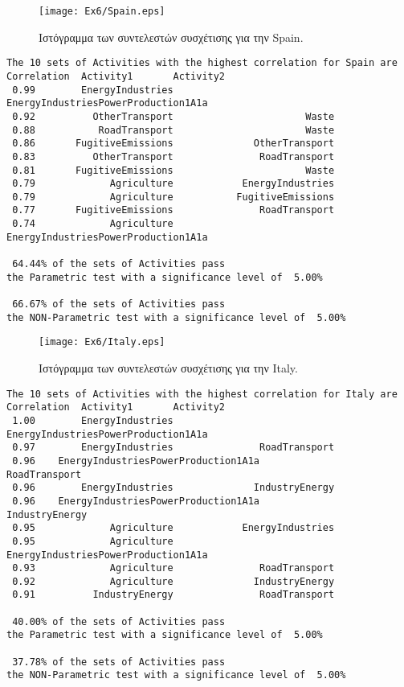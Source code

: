 \documentclass[11pt]{scrartcl} %
\begin{document}
\begin{figure}[H]
 
	\centering
	\texttt{[image: Ex6/Spain.eps]}	
\caption{Ιστόγραμμα των συντελεστών συσχέτισης για την Spain.}
\label{fig:z62}
\end{figure}



\begin{Verbatim}[fontsize=\small]
The 10 sets of Activities with the highest correlation for Spain are
Correlation	 Activity1	 	 Activity2
 0.99	     EnergyIndustries	 	 EnergyIndustriesPowerProduction1A1a 
 0.92	       OtherTransport	 	                Waste 
 0.88	        RoadTransport	 	                Waste 
 0.86	    FugitiveEmissions	 	       OtherTransport 
 0.83	       OtherTransport	 	        RoadTransport 
 0.81	    FugitiveEmissions	 	                Waste 
 0.79	          Agriculture	 	     EnergyIndustries 
 0.79	          Agriculture	 	    FugitiveEmissions 
 0.77	    FugitiveEmissions	 	        RoadTransport 
 0.74	          Agriculture	 	 EnergyIndustriesPowerProduction1A1a 

 64.44% of the sets of Activities pass 
the Parametric test with a significance level of  5.00%

 66.67% of the sets of Activities pass 
the NON-Parametric test with a significance level of  5.00%
\end{Verbatim}


\begin{figure}[H]

	\centering
	\texttt{[image: Ex6/Italy.eps]}	
\caption{Ιστόγραμμα των συντελεστών συσχέτισης για την Italy.}
\label{fig:z63} 
\end{figure}



\begin{Verbatim}[fontsize=\small]
The 10 sets of Activities with the highest correlation for Italy are
Correlation	 Activity1	 	 Activity2
 1.00	     EnergyIndustries	 	 EnergyIndustriesPowerProduction1A1a 
 0.97	     EnergyIndustries	 	        RoadTransport 
 0.96	 EnergyIndustriesPowerProduction1A1a	 	        RoadTransport 
 0.96	     EnergyIndustries	 	       IndustryEnergy 
 0.96	 EnergyIndustriesPowerProduction1A1a	 	       IndustryEnergy 
 0.95	          Agriculture	 	     EnergyIndustries 
 0.95	          Agriculture	 	 EnergyIndustriesPowerProduction1A1a 
 0.93	          Agriculture	 	        RoadTransport 
 0.92	          Agriculture	 	       IndustryEnergy 
 0.91	       IndustryEnergy	 	        RoadTransport 

 40.00% of the sets of Activities pass 
the Parametric test with a significance level of  5.00%

 37.78% of the sets of Activities pass 
the NON-Parametric test with a significance level of  5.00%
\end{Verbatim}
\end{document}
